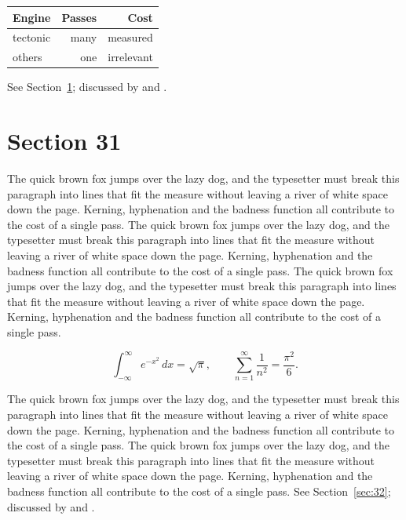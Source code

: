 \documentclass{article}
\begin{document}
\begin{center}
\begin{tabular}{lrr}
\toprule
Engine & Passes & Cost \\
\midrule
tectonic & many & measured \\
others & one & irrelevant \\
\bottomrule
\end{tabular}
\end{center}

See Section~\ref{sec:31}; discussed by \textcite{k1} and \textcite{l3}.
\section{Section 31}
\label{sec:31}
The quick brown fox jumps over the lazy dog, and the typesetter must break this paragraph into lines that fit the measure without leaving a river of white space down the page. Kerning, hyphenation and the badness function all contribute to the cost of a single pass. The quick brown fox jumps over the lazy dog, and the typesetter must break this paragraph into lines that fit the measure without leaving a river of white space down the page. Kerning, hyphenation and the badness function all contribute to the cost of a single pass. The quick brown fox jumps over the lazy dog, and the typesetter must break this paragraph into lines that fit the measure without leaving a river of white space down the page. Kerning, hyphenation and the badness function all contribute to the cost of a single pass. 

\begin{equation}\label{eq:31}
\int_{-\infty}^{\infty} e^{-x^{2}}\,dx = \sqrt{\pi}, \qquad
\sum_{n=1}^{\infty} \frac{1}{n^{2}} = \frac{\pi^{2}}{6}.
\end{equation}

The quick brown fox jumps over the lazy dog, and the typesetter must break this paragraph into lines that fit the measure without leaving a river of white space down the page. Kerning, hyphenation and the badness function all contribute to the cost of a single pass. The quick brown fox jumps over the lazy dog, and the typesetter must break this paragraph into lines that fit the measure without leaving a river of white space down the page. Kerning, hyphenation and the badness function all contribute to the cost of a single pass. 
See Section~\ref{sec:32}; discussed by \textcite{k2} and \textcite{l4}.
\end{document}
